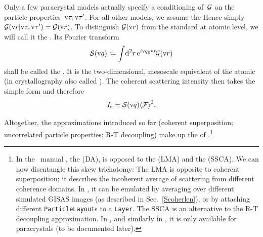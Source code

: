 Only a few paracrystal models actually specify
a conditioning of~$\mathcal{G}$ on the particle properties~$\text{v}\tau,\text{v}\tau'$.
For all other models, we assume the
Hence simply $\mathcal{G}(\text{v}{r}|\text{v}\tau,\text{v}\tau')=\mathcal{G}(\text{v}{r})$.
To distinguish $\mathcal{G}(\text{v}{r})$ from the standard 
%
at atomic level, we will call it the
.
%
Its Fourier transform
\begin{equation}
  \mathcal{S}(\text{v}{q})\coloneqq   \int\!\text{d}^2r\,   \text{e}^{i\text{v}{q}_{\parallel}\text{v}{r}}\!   \mathcal{G}(\text{v}{r})
\end{equation}
shall be called the .
It is the two-dimensional, mesoscale equivalent of
the atomic 
%
(in crystallography also called ).
%
The coherent scattering intensity then takes the simple form
and therefore
\Emph
{\begin{equation}
  I_\text{c} = \mathcal{S}(\text{v}{q}) {\left\langle\mathcal{F}\right\rangle}^2.
\end{equation}\vskip -5pt}

Altogether, the approximations introduced so far
(coherent superposition; uncorrelated particle properties;
R-T decoupling)
make up the 
of \IsGISAXS.\footnote
{In the \IsGISAXS\ manual \cite[Sec.~2.2]{Laz08},
the  (DA),
%
%
is opposed to the
 (LMA)
%
%
and the
 (SSCA).
%
%
We can now disentangle this skew trichotomy:
The LMA is opposite to coherent superposition;
it describes the incoherent average of
scattering from different coherence domains.
In \BornAgain,
it can be emulated by averaging over different simulated GISAS images
(as described in Sec.~\ref{Scoherlen}),
or by attaching different \texttt{ParticleLayout}s to a \texttt{Layer}.
The SSCA is an alternative to the R-T decoupling approximation.
In \IsGISAXS, and similarly in \BornAgain,
it is only available for paracrystals
(to be documented later).
}

